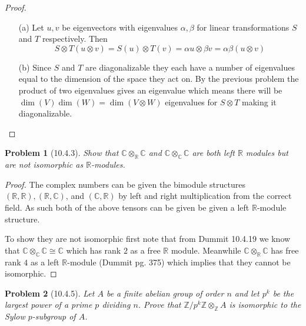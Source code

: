 \documentclass[10pt]{article}
\newcommand{\sk}{\vskip 10mm}
\newcommand{\bb}[1]{\mathbb{#1}}
\theoremstyle{plain}
\newtheorem{problem}{Problem}
\theoremstyle{remark}
\begin{document}
\begin{proof}
  \begin{enumerate}
  \item[(a)] Let $u,v$ be eigenvectors with eigenvalues $\alpha,\beta$ for linear
    transformations $S$ and $T$ respectively. Then
    \[
      S\otimes T(u\otimes v) = S(u)\otimes T(v)= \alpha u\otimes \beta v = \alpha\beta (u\otimes v)
    \]
  \item[(b)] Since $S$ and $T$ are diagonalizable they each have a number
    of eigenvalues equal to the dimension of the space they act on.
    By the previous problem the product of two eigenvalues gives an eigenvalue
    which means there will be $\dim(V)\dim(W)=\dim(V\otimes W)$ eigenvalues
    for $S\otimes T$ making it diagonalizable.
  \end{enumerate}
\end{proof}

\sk

\begin{problem}[10.4.3]
  Show that $\bb{C}\otimes_{\bb{R}}\bb{C}$ and $\bb{C}\otimes_{\bb{C}}\bb{C}$
  are both left $\bb{R}$ modules but are not isomorphic as $\bb{R}$-modules.
\end{problem}

\begin{proof}
  The complex numbers can be given the bimodule structures
  $(\bb{R},\bb{R}),(\bb{R},\bb{C})$, and $(\bb{C},\bb{R})$ by left
  and right multiplication from the correct field. As such both of the
  above tensors can be given be given a left $\bb{R}$-module structure.

  To show they are not isomorphic first note that from Dummit  10.4.19
  we know that $\bb{C}\otimes_{\bb{C}}\bb{C}\cong\bb{C}$ which has rank $2$ as
  a free $\bb{R}$ module. Meanwhile $\bb{C}\otimes_{\bb{R}}\bb{C}$ has free
  rank $4$ as a left $\bb{R}$-module (Dummit pg. 375) which implies that they cannot
  be isomorphic.
\end{proof}

\sk

\begin{problem}[10.4.5]
  Let $A$ be a finite abelian group of order $n$ and let $p^k$ be the largest
  power of a prime $p$ dividing $n$. Prove that
  $\bb{Z}/p^k\bb{Z}\otimes_{\bb{Z}}A$ is isomorphic to the Sylow $p$-subgroup
  of $A$.
\end{problem}
\end{document}
